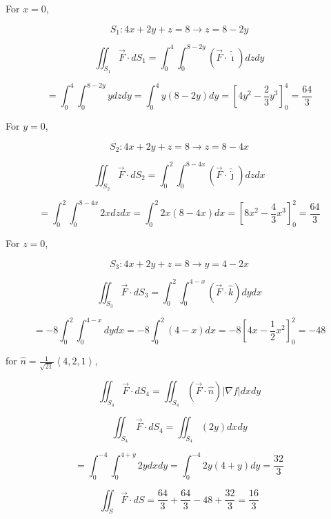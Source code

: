\documentclass[12pt]{article}
\begin{document}
For \(x = 0\),

\[
    S_1: 4x + 2y + z = 8 \rightarrow z = 8 - 2y
\]

\[
    \iint_{S_1} \vec{F} \cdot d S_1 = \int_{0}^{4} \int_{0}^{8-2y} \left( \vec{F} \cdot \hat{\dot{\imath}} \right) dz dy
\]

\[
    = \int_{0}^{4} \int_{0}^{8-2y} y dz dy
    = \int_{0}^{4} y(8-2y) dy
    = \left\lbrack 4y^2 - \frac{2}{3}y^3 \right\rbrack_{0}^{4}
    = \frac{64}{3}
\]

For \(y = 0\),

\[
    S_2: 4x + 2y + z = 8 \rightarrow z = 8 - 4x
\]

\[
    \iint_{S_2} \vec{F} \cdot d S_2 = \int_{0}^{2} \int_{0}^{8-4x} \left( \vec{F} \cdot \hat{\dot{\jmath}} \right) dz dx
\]

\[
    = \int_{0}^{2} \int_{0}^{8-4x} 2x dz dx
    = \int_{0}^{2} 2x(8-4x) dx
    = \left\lbrack 8x^2 - \frac{4}{3}x^3 \right\rbrack_{0}^{2}
    = \frac{64}{3}
\]

For \(z = 0\),

\[
    S_3: 4x + 2y + z = 8 \rightarrow y = 4 - 2x
\]

\[
    \iint_{S_3} \vec{F} \cdot d S_3 = \int_{0}^{2} \int_{0}^{4-x} \left( \vec{F} \cdot \hat{k} \right) dy dx
\]

\[
    = -8 \int_{0}^{2} \int_{0}^{4-x} dy dx
    = -8 \int_{0}^{2} (4-x) dx
    = -8 \left\lbrack 4x - \frac{1}{2}x^2 \right\rbrack_{0}^{2}
    = -48
\]

for \(\hat{n} = \frac{1}{\sqrt{21}} \left\langle 4, 2, 1\right\rangle \),

\[
    \iint_{S_4} \vec{F} \cdot d S_4 = \iint_{S_4} \left( \vec{F} \cdot \hat{n} \right) \left\vert \nabla f \right\vert dx dy
\]

\[
    \iint_{S_4} \vec{F} \cdot d S_4 = \iint_{S_4} \left( 2 y \right) dx dy
\]

\[
    = \int_{0}^{-4} \int_{0}^{4 + y} 2y dx dy
    = \int_{0}^{-4} 2y(4 + y) dy
    = \frac{32}{3}
\]

\[
    \iint_S \vec{F} \cdot d S = \frac{64}{3} + \frac{64}{3} - 48 + \frac{32}{3}
    = \frac{16}{3}
\]

\newpage


\nocite{El-Deeb_PEU-218_Assignments}
\end{document}
